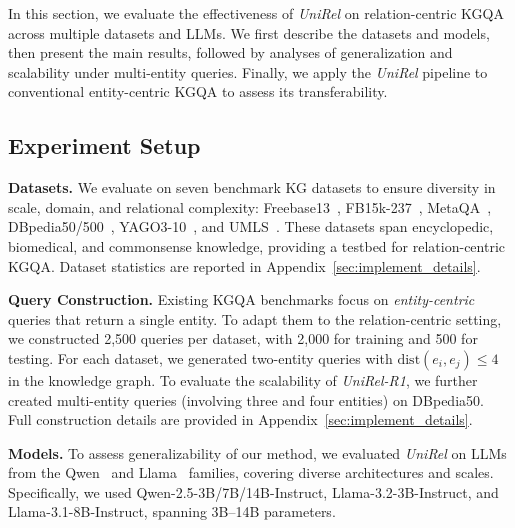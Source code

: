 


In this section, we evaluate the effectiveness of \textit{UniRel} on relation-centric KGQA across multiple datasets and LLMs.
We first describe the datasets and models, then present the main results, followed by analyses of generalization and scalability under multi-entity queries.
Finally, we apply the \textit{UniRel} pipeline to conventional entity-centric KGQA to assess its transferability.

\subsection{Experiment Setup}



\textbf{Datasets.} We evaluate on seven benchmark KG datasets to ensure diversity in scale, domain, and relational complexity:
Freebase13~\citep{Socher2013ReasoningWN}, FB15k-237~\citep{toutanova2015observed}, MetaQA~\citep{zhang2018variational},
DBpedia50/500~\citep{Auer07DBpedia}, YAGO3-10~\citep{Mahdisoltani2015YAGO3AK}, and UMLS~\citep{bodenreider2004umls}.
These datasets span encyclopedic, biomedical, and commonsense knowledge, providing a testbed for relation-centric KGQA.
Dataset statistics are reported in Appendix~\ref{sec:implement_details}.



\textbf{Query Construction.} Existing KGQA benchmarks focus on \textit{entity-centric} queries that return a single entity.  
To adapt them to the relation-centric setting, we constructed 2,500 queries per dataset, with 2,000 for training and 500 for testing.  
%
For each dataset, we generated two-entity queries with $\mathrm{dist}(e_i, e_j) \leq 4$ in the knowledge graph.  
To evaluate the scalability of \textit{UniRel-R1}, we further created multi-entity queries (involving three and four entities) on DBpedia50. 
Full construction details are provided in Appendix~\ref{sec:implement_details}.



\textbf{Models.}
To assess generalizability of our method, we evaluated \textit{UniRel} on LLMs from the Qwen~\citep{yang2025qwen3} and Llama~\citep{grattafiori2024llama} families, covering diverse architectures and scales.  
Specifically, we used Qwen-2.5-3B/7B/14B-Instruct, Llama-3.2-3B-Instruct, and Llama-3.1-8B-Instruct, spanning 3B–14B parameters. 

